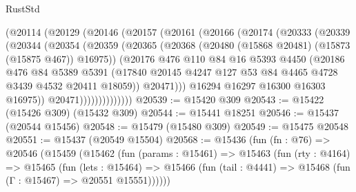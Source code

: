 \begin{lexlean}{RustStd}
\begin{coremodule}
              (@20114
                (@20129
                  (@20146
                    (@20157
                      (@20161
                        (@20166
                          (@20174
                            (@20333
                              (@20339
                                (@20344
                                  (@20354
                                    (@20359
                                      (@20365
                                        (@20368
                                          (@20480 (@15868 @20481) (@15873 (@15875 @467)) @16975))
                                        (@20176
                                          @476
                                          @110
                                          @84
                                          @16
                                          @5393
                                          @4450
                                          (@20186
                                            @476
                                            @84
                                            @5389
                                            @5391
                                            (@17840
                                              @20145
                                              @4247
                                              @127
                                              @53
                                              @84
                                              @4465
                                              @4728
                                              @3439
                                              @4532
                                              @20411
                                              @18059))
                                          @20471)))
                                    @16294
                                    @16297
                                    @16300
                                    @16303
                                    @16975))
                                @20471))))))))))))))
@20539 := @15420 @309
@20543 := @15422 (@15426 @309) (@15432 @309)
@20544 := @15441 @18251
@20546 := @15437 (@20544 @15456)
@20548 := @15479 (@15480 @309)
@20549 := @15475 @20548
@20551 := @15437 (@20549 @15504)
@20568 := @15436
    (fun (fn : @76) =>
    @20546
      (@15459
        (@15462
          (fun (params : @15461) =>
          @15463
            (fun (rty : @4164) =>
            @15465
              (fun (lets : @15464) =>
              @15466 (fun (tail : @4441) => @15468 (fun (Γ : @15467) => @20551 @15551))))))

\end{coremodule}
\end{lexlean}
